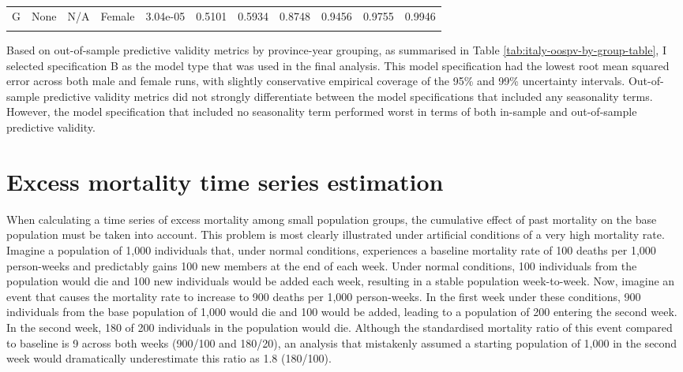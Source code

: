 \documentclass[
]{report}
\begin{document}
\begin{table}[!h]
\begin{tabular}[t]{llllrrrrrrr}
G & None & N/A & Female & 3.04e-05 & 0.5101 & 0.5934 & 0.8748 & 0.9456 & 0.9755 & 0.9946\\
\addlinespace
\cellcolor{gray!6}{G} & \cellcolor{gray!6}{None} & \cellcolor{gray!6}{N/A} & \cellcolor{gray!6}{(Average)} & \cellcolor{gray!6}{2.82e-05} & \cellcolor{gray!6}{0.4874} & \cellcolor{gray!6}{0.6023} & \cellcolor{gray!6}{0.8832} & \cellcolor{gray!6}{0.9500} & \cellcolor{gray!6}{0.9790} & \cellcolor{gray!6}{0.9949}\\
\bottomrule
\end{tabular}
\end{table}

Based on out-of-sample predictive validity metrics by province-year grouping, as summarised in Table \ref{tab:italy-oospv-by-group-table}, I selected specification B as the model type that was used in the final analysis. This model specification had the lowest root mean squared error across both male and female runs, with slightly conservative empirical coverage of the 95\% and 99\% uncertainty intervals. Out-of-sample predictive validity metrics did not strongly differentiate between the model specifications that included any seasonality terms. However, the model specification that included no seasonality term performed worst in terms of both in-sample and out-of-sample predictive validity.

\hypertarget{excess-mortality-time-series-estimation}{%
\section*{Excess mortality time series estimation}\label{excess-mortality-time-series-estimation}}

When calculating a time series of excess mortality among small population groups, the cumulative effect of past mortality on the base population must be taken into account. This problem is most clearly illustrated under artificial conditions of a very high mortality rate. Imagine a population of 1,000 individuals that, under normal conditions, experiences a baseline mortality rate of 100 deaths per 1,000 person-weeks and predictably gains 100 new members at the end of each week. Under normal conditions, 100 individuals from the population would die and 100 new individuals would be added each week, resulting in a stable population week-to-week. Now, imagine an event that causes the mortality rate to increase to 900 deaths per 1,000 person-weeks. In the first week under these conditions, 900 individuals from the base population of 1,000 would die and 100 would be added, leading to a population of 200 entering the second week. In the second week, 180 of 200 individuals in the population would die. Although the standardised mortality ratio of this event compared to baseline is 9 across both weeks (900/100 and 180/20), an analysis that mistakenly assumed a starting population of 1,000 in the second week would dramatically underestimate this ratio as 1.8 (180/100).
\end{document}

